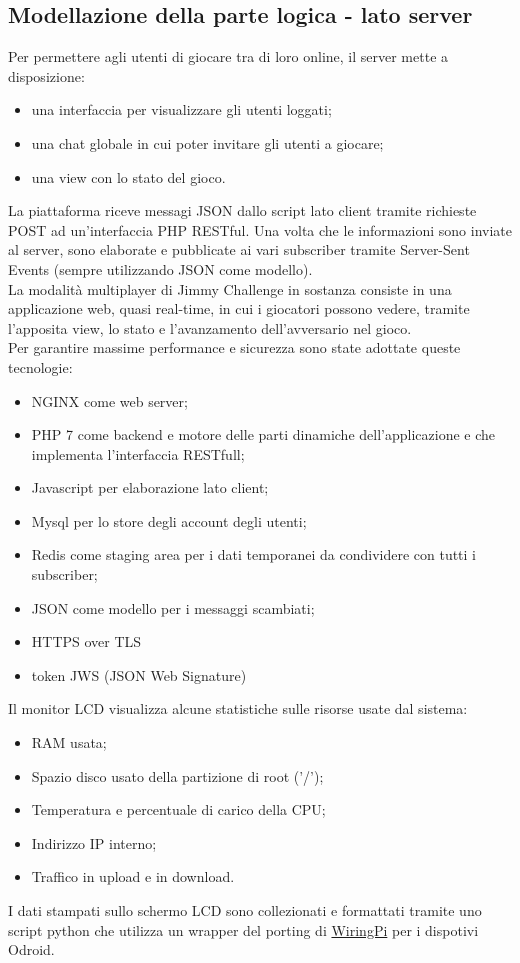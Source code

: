 \subsection{Modellazione della parte logica - lato server}
Per permettere agli utenti di giocare tra di loro online, il server mette a disposizione:
\begin{itemize}
	\item una interfaccia per visualizzare gli utenti loggati;
	\item una chat globale in cui poter invitare gli utenti a giocare;
	\item una view con lo stato del gioco.
\end{itemize}
La piattaforma riceve messagi JSON dallo script lato client tramite richieste POST ad un'interfaccia PHP RESTful. Una volta che le informazioni sono inviate al server, sono elaborate e pubblicate ai vari subscriber tramite Server-Sent Events (sempre utilizzando JSON come modello).\\
La modalità multiplayer di Jimmy Challenge in sostanza consiste in una applicazione web, quasi real-time, in cui i giocatori possono vedere, tramite l'apposita view, lo stato e l'avanzamento dell'avversario nel gioco.\\
Per garantire massime performance e sicurezza sono state adottate queste tecnologie:
\begin{itemize}
	\item NGINX come web server;
	\item PHP 7 come backend e motore delle parti dinamiche dell'applicazione e che implementa l'interfaccia RESTfull;
	\item Javascript per elaborazione lato client;
	\item Mysql per lo store degli account degli utenti;
	\item Redis come staging area per i dati temporanei da condividere con tutti i subscriber;
	\item JSON come modello per i messaggi scambiati;
	\item HTTPS over TLS
	\item token JWS (JSON Web Signature)
\end{itemize}
Il monitor LCD visualizza alcune statistiche sulle risorse usate dal sistema:
\begin{itemize}
	\item RAM usata;
	\item Spazio disco usato della partizione di root ('/');
	\item Temperatura e percentuale di carico della CPU;
	\item Indirizzo IP interno;
	\item Traffico in upload e in download.
\end{itemize}
I dati stampati sullo schermo LCD sono collezionati e formattati tramite uno script python che utilizza un wrapper del porting di \href{https://github.com/hardkernel/WiringPi2-Python}{WiringPi} per i dispotivi Odroid.

